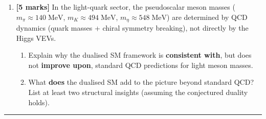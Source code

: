 \documentclass[11pt,a4paper]{article}
\begin{document}
\begin{enumerate}[label=(\alph*)]
    \begin{enumerate}[label=(\roman*)]
      \item Compute the quark mass ratios $m_t/m_c$, $m_c/m_u$,
        $m_b/m_s$, $m_s/m_d$ from the values above.
      \item If the VEV hierarchy is geometric:
        $\langle H_{33}\rangle/\langle H_{22}\rangle \sim 1/\epsilon$,
        $\langle H_{22}\rangle/\langle H_{11}\rangle \sim 1/\epsilon$,
        determine the value of $\epsilon$ needed to reproduce each of
        the ratios in~(i) (treating up-type and down-type sectors
        independently).
      \item Can a \textbf{single} value of $\epsilon$ simultaneously
        reproduce all four ratios?  What does this tell you about
        the $\mathcal{O}(1)$ coefficients?
        (Note: the hierarchy parameter $\varepsilon$ absorbs O(1) coefficients from the scalar potential; your answer should identify the parametric scaling, not a unique numerical value.)
    \end{enumerate}

  \item \textbf{[5 marks]}
    In the light-quark sector, the pseudoscalar meson masses
    ($m_\pi \approx 140\;\text{MeV}$,
    $m_K \approx 494\;\text{MeV}$,
    $m_\eta \approx 548\;\text{MeV}$) are determined by QCD
    dynamics (quark masses + chiral symmetry breaking), not
    directly by the Higgs VEVs.
    \begin{enumerate}[label=(\roman*)]
      \item Explain why the dualised SM framework is
        \textbf{consistent with}, but does not \textbf{improve upon},
        standard QCD predictions for light meson masses.
      \item What \textbf{does} the dualised SM add to the picture
        beyond standard QCD?  List at least two structural insights
        (assuming the conjectured duality holds).
    \end{enumerate}

\end{enumerate}


\bigskip
\hrule
\bigskip
\end{document}
